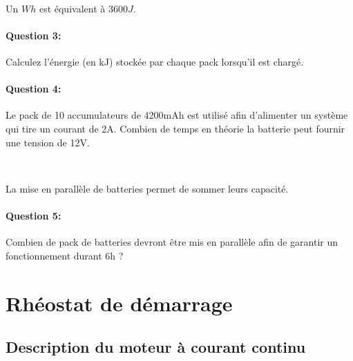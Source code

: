 ~\

Un $Wh$ est équivalent à $3600J$.

\paragraph{Question 3:} Calculez l'énergie (en kJ) stockée par chaque pack lorsqu'il est chargé.

\paragraph{Question 4:} Le pack de 10 accumulateurs de 4200mAh est utilisé afin d'alimenter un système qui tire un courant de 2A. Combien de temps en théorie la batterie peut fournir une tension de 12V.

~\

La mise en parallèle de batteries permet de sommer leurs capacité. 

\paragraph{Question 5:} Combien de pack de batteries devront être mis en parallèle afin de garantir un fonctionnement durant 6h ?

\newpage

\section{Rhéostat de démarrage}

\subsection{Description du moteur à courant continu}

